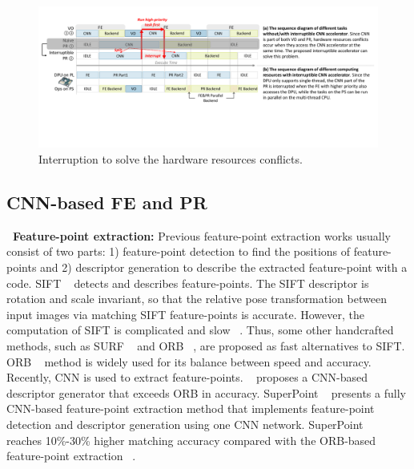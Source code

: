 
\label{sec:relate}


\begin{figure}[t]
	\centering
	\includegraphics[width=0.95\linewidth]{fig/interDPR.pdf}
    \caption{Interruption to solve the hardware resources conflicts.  
    }
	\label{fig:interDPR}
\end{figure}


\subsection{ CNN-based FE and PR }

\textbf{\quad \ Feature-point extraction:} Previous feature-point extraction works usually consist of two parts: 1) feature-point detection to find the positions of feature-points and 2) descriptor generation to describe the extracted feature-point with a code.
SIFT  ~\cite{Lowe-478}  detects and describes feature-points. The SIFT descriptor is rotation and scale invariant, so that the relative pose transformation between input images via matching SIFT feature-points is accurate. However, the computation of SIFT is complicated and slow  ~\cite{bay2006surf}. Thus, some other handcrafted methods, such as SURF ~\cite{bay2006surf} and ORB  ~\cite{Mur-Artal:2017281}, are proposed as fast alternatives to SIFT. ORB  ~\cite{Mur-Artal:2017281} method is widely used for its balance between speed and accuracy.
Recently, CNN is used to extract feature-points.  ~\cite{simo2015discriminative} proposes a CNN-based descriptor generator that exceeds ORB in accuracy.
SuperPoint  ~\cite{detone2018superpoint} presents a fully CNN-based feature-point extraction method that implements feature-point detection and descriptor generation using one CNN network. SuperPoint ~\cite{detone2018superpoint} reaches 10\%-30\% higher matching accuracy compared with the ORB-based feature-point extraction  ~\cite{Mur-Artal:2017281}. 

